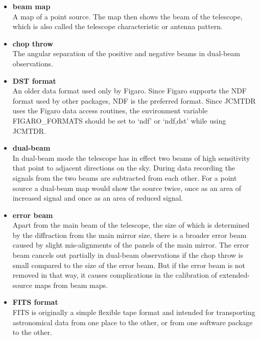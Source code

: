 \documentclass[11pt,noabs]{starlink}
\begin{document}
\begin{itemize}

\item\textbf{\label{glossbeammap}beam map}\\
   A map of a point source. The map
   then shows the beam of the telescope, which is also called the
   telescope characteristic or antenna pattern.

\item\textbf{\label{glosschopthrow}chop throw}\\
   The angular separation of the
   positive and negative beams in dual-beam observations.

\item\textbf{\label{glossdst}DST format}\\
   An older data format used only by
   Figaro. Since Figaro supports the NDF format used by other packages,
   NDF is the preferred format. Since JCMTDR uses the Figaro data access
   routines, the environment variable FIGARO\_FORMATS should be set to
   `ndf' or `ndf,dst' while using JCMTDR.

\item\textbf{\label{glossdualbeam}dual-beam}\\
   In dual-beam mode the telescope
   has in effect two beams of high
   sensitivity that point to adjacent directions on the sky. During data
   recording the signals from the two beams are subtracted from each
   other. For a point source a dual-beam map would show the source
   twice, once as an area of increased signal and once as an area of
   reduced signal.

\item\textbf{\label{glosserrorbeam}error beam}\\
   Apart from the main beam of the
   telescope, the size of which is determined by the diffraction from
   the main mirror size, there is a broader error beam caused by slight
   mis-alignments of the panels of the main mirror. The error beam
   cancels out partially in dual-beam observations if the chop throw is
   small compared to the size of the error beam. But if the error beam
   is not removed in that way, it causes complications in the
   calibration of extended-source maps from beam maps.

\item\textbf{\label{glossfits}FITS format}\\
   FITS is originally a simple flexible
   tape format and intended for transporting astronomical data from one
   place to the other, or from one software package to the other.


\end{itemize}
\end{document}
